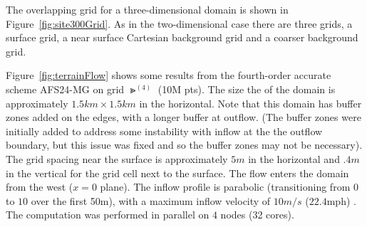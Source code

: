 \documentclass[11pt]{article}
\begin{document}
The overlapping grid for a three-dimensional domain is shown in Figure~\ref{fig:site300Grid}. As
in the two-dimensional case there are three grids, a surface grid, a near surface Cartesian background
grid and a coarser background grid.



Figure~\ref{fig:terrainFlow} shows some results from the fourth-order accurate scheme AFS24-MG on grid $\Gt^{(4)}$ (10M pts).
The size the of the domain is approximately $1.5 km \times 1.5 km$ in the horizontal. Note that this domain
has buffer zones added on the edges, with a longer buffer at outflow. 
(The buffer zones were initially added to address some instability with inflow at the
the outflow boundary, but this issue was fixed and so the buffer zones may not be necessary). 
The grid spacing near the surface is approximately $5m$ in the 
horizontal and $.4m$ in the vertical for the grid cell next to the surface. 
The flow enters the domain from the west ($x=0$ plane). 
The inflow profile is parabolic (transitioning from $0$ to $10$ over the first 50m), with a maximum inflow
velocity of $10 m/s$ ($22.4$mph) . The computation was performed in parallel on $4$ nodes (32 cores). 

% 
\end{document}
